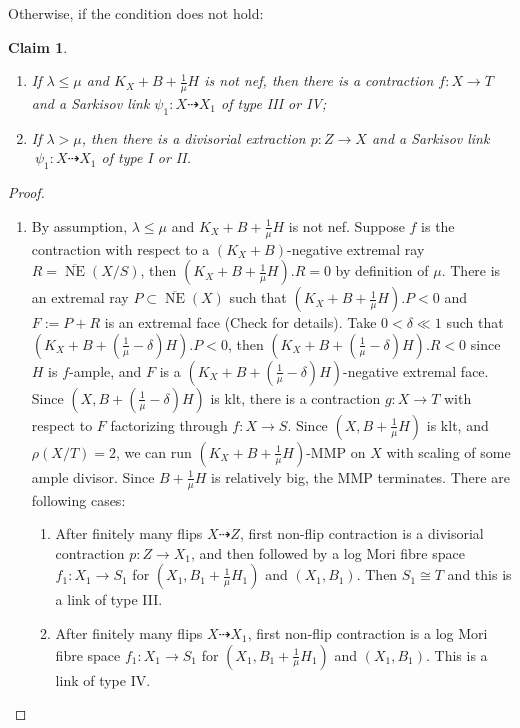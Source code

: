 \documentclass[11pt]{amsart}
\newtheorem{claim}[defn]{Claim}
\begin{document}
Otherwise, if the condition does not hold:
\begin{claim}
  \begin{enumerate}
  \item If $ \lambda\leqslant\mu $ and $ K_X+B+\frac{1}{\mu}H $ is not nef, then there is a contraction $f:X \to T$ and a Sarkisov link $\psi_{1}:X\dashrightarrow X_{1}$ of type III or IV;
    \item  If $ \lambda>\mu $, then there is a divisorial extraction $p:Z\to X$ and a Sarkisov link $\
     \psi_{1}:X\dashrightarrow X_{1}$ of type I or II.
\end{enumerate} 
\end{claim}
\begin{proof}
\begin{enumerate}
  \item\label{a} By assumption,  $\lambda\leqslant \mu$ and   $ K_X+B+\frac{1}{\mu}H $ is not nef. Suppose $ f $ is the contraction with respect to a $ (K_X+B) $-negative extremal ray $ R= \overline{\operatorname{ NE }}(X/S) $, then $ (K_X+B+\frac{1}{\mu}H).R=0 $ by definition of $ \mu $. There is an extremal ray $ P \subset \overline{\operatorname{ NE }}(X) $ such that $ (K_X+B+\frac{1}{\mu}H).P<0 $ and $ F:=P+R $ is an extremal face  (Check \cite[5.4.2]{cortiFactoringBirationalMaps} for details). Take  $ 0<\delta\ll 1 $ such that $ (K_X+B+(\frac{1}{\mu}-\delta)H).P<0 $, then $  (K_X+B+(\frac{1}{\mu}-\delta)H).R<0 $ since $H$ is $f$-ample, and $ F $ is a $  (K_X+B+(\frac{1}{\mu}-\delta)H) $-negative extremal face. Since $ (X,B+(\frac{1}{\mu}-\delta)H) $ is klt, there is  a contraction $ g:X\to T $ with respect  to $ F $ factorizing through $ f:X\to S $. Since  $ (X,B+\frac{1}{\mu}H) $ is klt, and $ \rho(X/T)=2 $,  we can  run $ (K_X+B+\frac{1}{\mu}H) $-MMP on $ X  $ with scaling of some ample divisor.  Since $ B+\frac{1}{\mu}H $ is relatively big,  the MMP terminates. There are following cases: 
  \begin{enumerate}
    \item\label{a1} 
      After finitely many flips $ X\dashrightarrow Z $, first non-flip contraction is a divisorial contraction $ p:Z\to X_1 $, and then followed by a log Mori fibre space $f_{1}:X_{1}\to S_{1}$ for $(X_{1},B_{1}+\frac{1}{\mu}H_{1})$ and $(X_{1},B_{1})$.
    Then  $S_{1} \cong T$ and this is a link of type III.     
   \item\label{a2}
      After finitely many flips $ X\dashrightarrow X_1 $, first non-flip contraction is a log Mori fibre space $ f_1:X_1\to S_{1} $ for $(X_{1},B_{1}+\frac{1}{\mu}H_{1})$ and $(X_{1},B_{1})$. This is a link of type IV.  

\end{enumerate}
\end{enumerate}
\end{proof}
\end{document}
